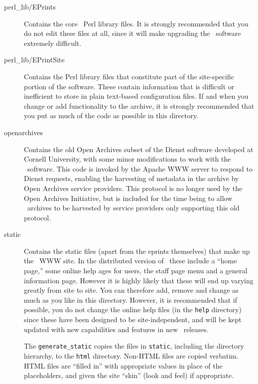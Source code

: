 \begin{description}
\item[perl\_lib/EPrints]

Contains the core \eprints\ Perl library files.  It is strongly recommended that you do not edit these files at all, since it will make upgrading the \eprints\ software extremely difficult.

\item[perl\_lib/EPrintSite]

Contains the Perl library files that constitute part of the site-specific portion of the software. These contain information that is difficult or inefficient to store in plain text-based configuration files. If and when you change or add functionality to the archive, it is strongly recommended that you put as much of the code as possible in this directory.

\item[openarchives]

Contains the old Open Archives subset of the Dienst software developed at Cornell University, with some minor modifications to work with the \eprints\ software. This code is invoked by the Apache WWW server to respond to Dienst requests, enabling the harvesting of metadata in the archive by Open Archives service providers. This protocol is no longer used by the Open Archives Initiative, but is included for the time being to allow \eprints\ archives to be harvested by service providers only supporting this old protocol.

\item[static]

Contains the static files (apart from the eprints themselves) that make up the \eprints\ WWW site. In the distributed version of \eprints\, these include a ``home page,'' some online help ages for users, the staff page menu and a general information page. However it is highly likely  that these will end up varying greatly from site to site. You can therefore add, remove and change as much as you like in this directory. However, it is recommended that if possible, you do not change the online help files (in the {\tt help} directory) since these have been designed to be site-independent, and will be kept updated with new capabilities and features in  new \eprints\ releases.

The {\tt generate\_static} copies the files in {\tt static}, including the directory hierarchy, to the {\tt html} directory. Non-HTML files are copied verbatim. HTML files are ``filled in'' with appropriate values in place of the placeholders, and given the site ``skin'' (look and feel) if appropriate.
\end{description}


